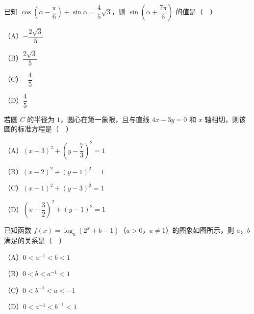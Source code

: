 \begin{question}
已知 $\cos\left(\alpha-\dfrac{\pi}{6}\right)+\sin\alpha=\dfrac45\sqrt3$，则 $\sin\left(\alpha+\dfrac{7\pi}{6}\right)$ 的值是（　）

（A）$-\dfrac{2\sqrt3}5$

（B）$\dfrac{2\sqrt3}5$

（C）$-\dfrac45$

（D）$\dfrac45$

\end{question}
\begin{question}
若圆 $C$ 的半径为 $1$，圆心在第一象限，且与直线 $4x-3y=0$ 和 $x$ 轴相切，则该圆的标准方程是（　）

（A）$(x-3)^2+\left(y-\dfrac73\right)^2=1$

（B）$(x-2)^2+(y-1)^2=1$

（C）$(x-1)^2+(y-3)^2=1$

（D）$\left(x-\dfrac32\right)^2+(y-1)^2=1$

\Needspace{0.4\textheight}
\end{question}
\begingroup
\renewenvironment{question}{\Needspace{0.45\textheight}}{}
\begin{question}
已知函数 $f(x)=\log_a(2^x+b-1)$（$a>0$，$a\neq1$）的图象如图所示，则 $a$，$b$ 满足的关系是（　）
\nopagebreak[4]
\begin{center}\end{center}
\nopagebreak[4]
（A）$0<a^{-1}<b<1$

（B）$0<b<a^{-1}<1$

（C）$0<b^{-1}<a<-1$

（D）$0<a^{-1}<b^{-1}<1$

\end{question}
\endgroup
{}

